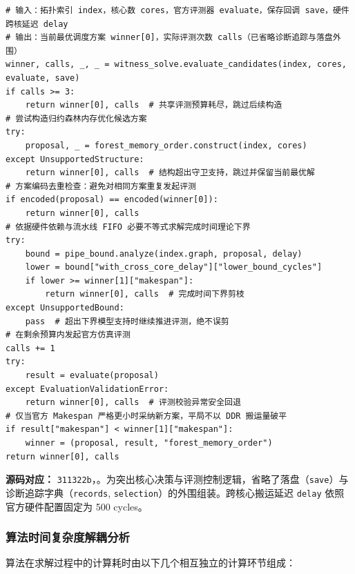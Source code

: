 \documentclass[anonymous,notoc]{gmcm2026}
\begin{document}
\FloatBarrier
\begin{algorithm}[!htbp]
\caption{问题三归约森林与多候选协同求解算法}\label{alg:p3-forest-solve}
\small


\begin{lstlisting}[style=paperpseudo]
# 输入：拓扑索引 index，核心数 cores，官方评测器 evaluate，保存回调 save，硬件跨核延迟 delay
# 输出：当前最优调度方案 winner[0]，实际评测次数 calls（已省略诊断追踪与落盘外围）
winner, calls, _, _ = witness_solve.evaluate_candidates(index, cores, evaluate, save)
if calls >= 3:
    return winner[0], calls  # 共享评测预算耗尽，跳过后续构造
# 尝试构造归约森林内存优化候选方案
try:
    proposal, _ = forest_memory_order.construct(index, cores)
except UnsupportedStructure:
    return winner[0], calls  # 结构超出守卫支持，跳过并保留当前最优解
# 方案编码去重检查：避免对相同方案重复发起评测
if encoded(proposal) == encoded(winner[0]):
    return winner[0], calls
# 依据硬件依赖与流水线 FIFO 必要不等式求解完成时间理论下界
try:
    bound = pipe_bound.analyze(index.graph, proposal, delay)
    lower = bound["with_cross_core_delay"]["lower_bound_cycles"]
    if lower >= winner[1]["makespan"]:
        return winner[0], calls  # 完成时间下界剪枝
except UnsupportedBound:
    pass  # 超出下界模型支持时继续推进评测，绝不误剪
# 在剩余预算内发起官方仿真评测
calls += 1
try:
    result = evaluate(proposal)
except EvaluationValidationError:
    return winner[0], calls  # 评测校验异常安全回退
# 仅当官方 Makespan 严格更小时采纳新方案，平局不以 DDR 搬运量破平
if result["makespan"] < winner[1]["makespan"]:
    winner = (proposal, result, "forest_memory_order")
return winner[0], calls
\end{lstlisting}
\textbf{源码对应：} \texttt{311322b}，\texttt{}。为突出核心决策与评测控制逻辑，省略了落盘（\texttt{save}）与诊断追踪字典（\texttt{records}, \texttt{selection}）的外围组装。跨核心搬运延迟 \texttt{delay} 依照官方硬件配置固定为 500 cycles。

\end{algorithm}
\FloatBarrier

\subsubsection{算法时间复杂度解耦分析}

算法在求解过程中的计算耗时由以下几个相互独立的计算环节组成：
\end{document}
